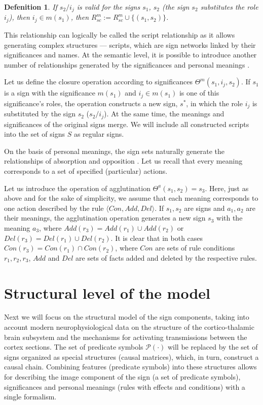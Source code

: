 \documentclass[12pt]{scrartcl}
\newtheorem{definition}{Defenition}
\begin{document}
	\begin{definition}
		If $s_2 / i_j$ is valid for the signs $s_1$, $s_2$ (the sign $s_2$ substitutes the role $i_j$), then $i_j\in m(s_1)$, then $R^m_{sc}:=R^m_{sc}\cup\{(s_1,s_2)\}$.
	\end{definition}
	
	This relationship can logically be called the script relationship as it allows generating complex structures --- scripts, which are sign networks linked by their significances and names. At the semantic level, it is possible to introduce another number of relationships generated by the significances and personal meanings \cite{Osipov2014c}.
	
	Let us define the closure operation according to significances $\Theta^m(s_1,i_j,s_2)$. If $s_1$ is a sign with the significance $m(s_1)$ and $i_j\in m(s_1)$ is one of this significance’s roles, the operation constructs a new sign, $s^*$, in which the role $i_j$ is substituted by the sign $s_2$ ($s_2/i_j$). At the same time, the meanings and significances of the original signs merge. We will include all constructed scripts into the set of signs $S$ as regular signs.
	
	On the basis of personal meanings, the sign sets naturally generate the relationships of absorption and opposition \cite{Osipov2014c}. Let us recall that every meaning corresponds to a set of specified (particular) actions.
	
	Let us introduce the operation of agglutination $\Theta^a(s_1,s_2)=s_3$. Here, just as above and for the sake of simplicity, we assume that each meaning corresponds to one action described by the rule $\langle Con, Add, Del \rangle$. If $s_1,s_2$ are signs and $a_1,a_2$ are their meanings, the agglutination operation generates a new sign $s_3$ with the meaning $a_3$, where $Add(r_3)=Add(r_1)\cup Add(r_2)$ or $Del(r_3)=Del(r_1)\cup Del(r_2)$. It is clear that in both cases $Con(r_3)=Con(r_1)\cap Con(r_2)$, where $Con$ are sets of rule conditions $r_1,r_2,r_3$, $Add$ and $Del$ are sets of facts added and deleted by the respective rules.
		
	\section{Structural level of the model}\label{sec:structure}
	
	Next we will focus on the structural model of the sign components, taking into account modern neurophysiological data on the structure of the cortico-thalamic brain subsystem and the mechanisms for activating transmissions between the cortex sections. The set of predicate symbols $\mathcal P(\cdot)$ will be replaced by the set of signs organized as special structures (causal matrices), which, in turn, construct a causal chain. Combining features (predicate symbols) into these structures allows for describing the image component of the sign (a set of predicate symbols), significances and personal meanings (rules with effects and conditions) with a single formalism.
	
\end{document}
